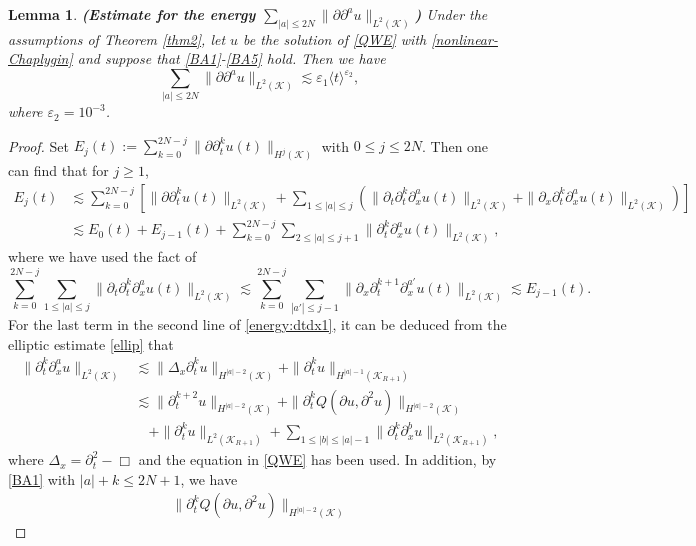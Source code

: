 \documentclass[11pt,twoside]{article}
\def\cK{\mathcal K}
\def\ds{\displaystyle}
\def\p{\partial}
\def\ve{\varepsilon}
\def\ls{\lesssim}
\newcommand{\w}[1]{\langle {#1} \rangle}
\theoremstyle{plain}
\newtheorem{lemma}[theorem]{Lemma}
\theoremstyle{definition}
\numberwithin{equation}{section}
\begin{document}
\begin{lemma}\label{lem:energy:dtdx}
{\bf (Estimate for the energy $\ds\sum_{|a|\le2N}\|\p\p^au\|_{L^2(\cK)}$)}
Under the assumptions of Theorem \ref{thm2}, let $u$ be the solution of \eqref{QWE}  with \eqref{nonlinear-Chaplygin}
and suppose that \eqref{BA1}-\eqref{BA5} hold.
Then we have
\begin{equation}\label{energy:dtdx}
\sum_{|a|\le2N}\|\p\p^au\|_{L^2(\cK)}\ls\ve_1\w{t}^{\ve_2},
\end{equation}
where $\ve_2=10^{-3}$.
\end{lemma}
\begin{proof}
Set $\ds E_j(t):=\sum_{k=0}^{2N-j}\|\p\p_t^ku(t)\|_{H^j(\cK)}$ with $0\le j\le2N$.
Then one can find that for $j\ge1$,
\begin{equation}\label{energy:dtdx1}
\begin{split}
E_j(t)&\ls\sum_{k=0}^{2N-j}[\|\p\p_t^ku(t)\|_{L^2(\cK)}
+\sum_{1\le|a|\le j}(\|\p_t\p_t^k\p_x^au(t)\|_{L^2(\cK)}+\|\p_x\p_t^k\p_x^au(t)\|_{L^2(\cK)})]\\
&\ls E_0(t)+E_{j-1}(t)+\sum_{k=0}^{2N-j}\sum_{2\le|a|\le j+1}\|\p_t^k\p_x^au(t)\|_{L^2(\cK)},
\end{split}
\end{equation}
where we have used the fact of
\begin{equation*}
\sum_{k=0}^{2N-j}\sum_{1\le|a|\le j}\|\p_t\p_t^k\p_x^au(t)\|_{L^2(\cK)}
\ls\sum_{k=0}^{2N-j}\sum_{|a'|\le j-1}\|\p_x\p_t^{k+1}\p_x^{a'}u(t)\|_{L^2(\cK)}
\ls E_{j-1}(t).
\end{equation*}
For the last term in the second line of \eqref{energy:dtdx1}, it can be deduced from the elliptic estimate \eqref{ellip} that
\begin{equation}\label{energy:dtdx2}
\begin{split}
\|\p_t^k\p_x^au\|_{L^2(\cK)}&\ls\|\Delta_x\p_t^ku\|_{H^{|a|-2}(\cK)}+\|\p_t^ku\|_{H^{|a|-1}(\cK_{R+1})}\\
&\ls\|\p_t^{k+2}u\|_{H^{|a|-2}(\cK)}+\|\p_t^kQ(\p u,\p^2u)\|_{H^{|a|-2}(\cK)}\\
&\quad+\|\p_t^ku\|_{L^2(\cK_{R+1})}+\sum_{1\le|b|\le|a|-1}\|\p_t^k\p_x^bu\|_{L^2(\cK_{R+1})},
\end{split}
\end{equation}
where $\Delta_x=\p_t^2-\Box$ and the equation in \eqref{QWE} has been used.
In addition, by \eqref{BA1} with $|a|+k\le2N+1$, we have
\begin{equation}\label{energy:dtdx3}
\begin{split}
\|\p_t^kQ(\p u,\p^2u)\|_{H^{|a|-2}(\cK)}

\end{split}
\end{equation}
\end{proof}
\end{document}
